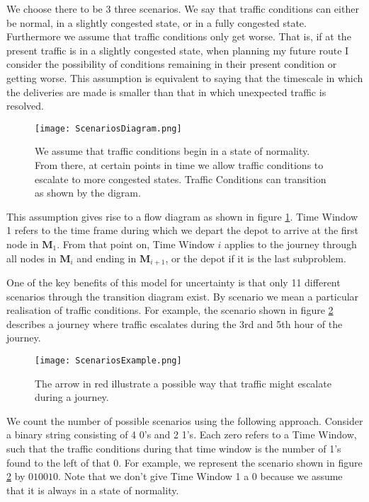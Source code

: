 We choose there to be 3  three scenarios. We say that traffic conditions can either be normal, in a slightly congested state, or in a fully congested state. Furthermore we assume that traffic conditions only get worse. That is, if at the present traffic is in a slightly congested state, when planning my future route I consider the possibility of conditions remaining in their present condition or getting worse. This assumption is equivalent to saying that the timescale in which the deliveries are made is smaller than that in which unexpected traffic is resolved.

\begin{figure}[h!]
	\centering
	\texttt{[image: ScenariosDiagram.png]}
	\caption{We assume that traffic conditions begin in a state of normality. From there, at certain points in time we allow traffic conditions to escalate to more congested states. Traffic Conditions can transition as shown by the digram.}
	\label{fig:scen_diag}
\end{figure}

This assumption gives rise to a flow diagram as shown in figure \ref{fig:scen_diag}. Time Window 1 refers to the time frame during which we depart the depot to arrive at the first node in $\mathbf{M}_1$. From that point on, Time Window $i$ applies to the journey through all nodes in $\mathbf{M}_{i}$ and ending in $\mathbf{M}_{i+1}$, or the depot if it is the last subproblem. 

One of the key benefits of this model for uncertainty is that only 11 different scenarios through the transition diagram exist. By scenario we mean a particular realisation of traffic conditions. For example, the scenario shown in figure \ref{fig:scen_ex} describes a journey where traffic escalates during the 3rd and 5th hour of the journey.

\begin{figure}[h!]
	\centering
	\texttt{[image: ScenariosExample.png]}
	\caption{The arrow in red illustrate a possible way that traffic might escalate during a journey.}
	\label{fig:scen_ex}
\end{figure}

We count the number of possible scenarios using the following approach. Consider a binary string consisting of 4 0's and 2 1's. Each zero refers to a Time Window, such that the traffic conditions during that time window is the number of 1's found to the left of that 0. For example, we represent the scenario shown in figure \ref{fig:scen_ex} by $010010$. Note that we don't give Time Window 1 a 0 because we assume that it is always in a state of normality. 

